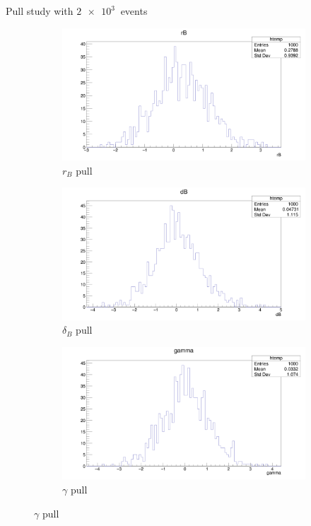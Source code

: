 \documentclass{beamer}
\begin{document}
\begin{frame}{Pull study with $\SI{2e3}{}$ events}
  \begin{figure}
    \centering
    \vspace{-0.2cm}
    \begin{subfigure}{0.5\textwidth}
      \includegraphics[width = 1.0\textwidth]{AmplitudePulls/rB1K1K.png}
      \caption{$r_B$ pull}
    \end{subfigure}%
    \begin{subfigure}{0.5\textwidth}
      \includegraphics[width = 1.0\textwidth]{AmplitudePulls/dB1K1K.png}
      \caption{$\delta_B$ pull}
    \end{subfigure}
    \begin{subfigure}{0.5\textwidth}
      \includegraphics[width = 1.0\textwidth]{AmplitudePulls/gamma1K1K.png}
      \caption{$\gamma$ pull}
    \end{subfigure}
  \end{figure}
\end{frame}
\end{document}
